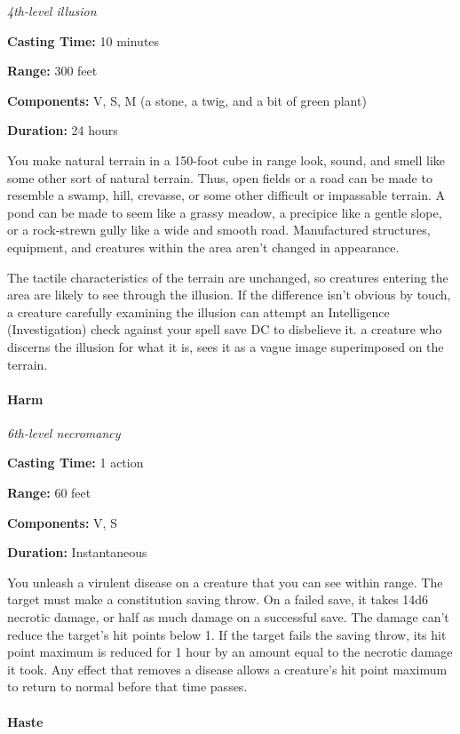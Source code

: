 \documentclass[
]{article}
\begin{document}
\emph{4th-level illusion}

\textbf{Casting Time:} 10 minutes

\textbf{Range:} 300 feet

\textbf{Components:} V, S, M (a stone, a twig, and a bit of green plant)

\textbf{Duration:} 24 hours

You make natural terrain in a 150-foot cube in range look, sound, and
smell like some other sort of natural terrain. Thus, open fields or a
road can be made to resemble a swamp, hill, crevasse, or some other
difficult or impassable terrain. A pond can be made to seem like a
grassy meadow, a precipice like a gentle slope, or a rock-strewn gully
like a wide and smooth road. Manufactured structures, equipment, and
creatures within the area aren't changed in appearance.

The tactile characteristics of the terrain are unchanged, so creatures
entering the area are likely to see through the illusion. If the
difference isn't obvious by touch, a creature carefully examining the
illusion can attempt an Intelligence (Investigation) check against your
spell save DC to disbelieve it. a creature who discerns the illusion for
what it is, sees it as a vague image superimposed on the terrain.

\hypertarget{harm}{%
\paragraph{Harm}\label{harm}}

\emph{6th-level necromancy}

\textbf{Casting Time:} 1 action

\textbf{Range:} 60 feet

\textbf{Components:} V, S

\textbf{Duration:} Instantaneous

You unleash a virulent disease on a creature that you can see within
range. The target must make a constitution saving throw. On a failed
save, it takes 14d6 necrotic damage, or half as much damage on a
successful save. The damage can't reduce the target's hit points below
1. If the target fails the saving throw, its hit point maximum is
reduced for 1 hour by an amount equal to the necrotic damage it took.
Any effect that removes a disease allows a creature's hit point maximum
to return to normal before that time passes.

\hypertarget{haste}{%
\paragraph{Haste}\label{haste}}
\end{document}
